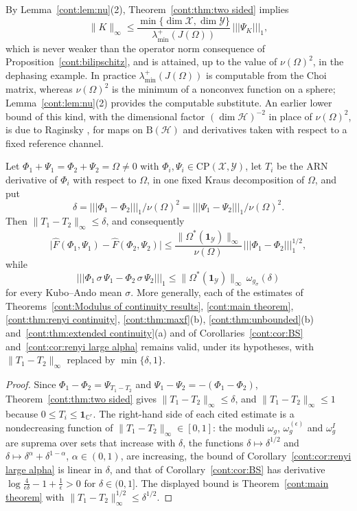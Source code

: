 \begin{remark}
By Lemma~\ref{cont:lem:nu}(2), Theorem~\ref{cont:thm:two sided} implies
\[
\|K\|_\infty\leq\frac{\min\{\dim\mathcal{X},\dim\mathcal{Y}\}}{\lambda^+_{\min}(J(\Omega))}\,|||\Psi_K|||_1 ,
\]
which is never weaker than the operator norm consequence of Proposition~\ref{cont:bilipschitz}, and is attained, up to the value of $\nu(\Omega)^2$, in the dephasing example. In practice $\lambda^+_{\min}(J(\Omega))$ is computable from the Choi matrix, whereas $\nu(\Omega)^2$ is the minimum of a nonconvex function on a sphere; Lemma~\ref{cont:lem:nu}(2) provides the computable substitute. An earlier lower bound of this kind, with the dimensional factor $(\dim\mathcal{H})^{-2}$ in place of $\nu(\Omega)^2$, is due to Raginsky \cite[eq.~(17)]{Raginsky2003}, for maps on $\mathrm{B}(\mathcal{H})$ and derivatives taken with respect to a fixed reference channel.
\end{remark}

\begin{corollary}\label{cont:cor:cb continuity}
Let $\Phi_1+\Psi_1=\Phi_2+\Psi_2=\Omega\neq0$ with $\Phi_i,\Psi_i\in\mathrm{CP}(\mathcal{X},\mathcal{Y})$, let $T_i$ be the ARN derivative of $\Phi_i$ with respect to $\Omega$, in one fixed Kraus decomposition of $\Omega$, and put
\[
\delta=|||\Phi_1-\Phi_2|||_1/\nu(\Omega)^2=|||\Psi_1-\Psi_2|||_1/\nu(\Omega)^2.
\]
Then $\|T_1-T_2\|_\infty\leq\delta$, and consequently
\[
\big|\widehat{F}(\Phi_1,\Psi_1)-\widehat{F}(\Phi_2,\Psi_2)\big|\leq\frac{\|\Omega^*(\mathbf{1}_{\mathcal{Y}})\|_\infty}{\nu(\Omega)}\,|||\Phi_1-\Phi_2|||_1^{1/2},
\]
while
\[
|||\Phi_1\,\sigma\,\Psi_1-\Phi_2\,\sigma\,\Psi_2|||_1\leq\|\Omega^*(\mathbf{1}_{\mathcal{Y}})\|_\infty\,\omega_{g_\sigma}(\delta)
\]
for every Kubo--Ando mean $\sigma$. More generally, each of the estimates of Theorems~\ref{cont:Modulus of continuity results}, \ref{cont:main theorem}, \ref{cont:thm:renyi continuity}, \ref{cont:thm:maxf}(b), \ref{cont:thm:unbounded}(b) and~\ref{cont:thm:extended continuity}(a) and of Corollaries~\ref{cont:cor:BS} and~\ref{cont:cor:renyi large alpha} remains valid, under its hypotheses, with $\|T_1-T_2\|_\infty$ replaced by $\min\{\delta,1\}$.
\end{corollary}

\begin{proof}
Since $\Phi_1-\Phi_2=\Psi_{T_1-T_2}$ and $\Psi_1-\Psi_2=-(\Phi_1-\Phi_2)$, Theorem~\ref{cont:thm:two sided} gives $\|T_1-T_2\|_\infty\leq\delta$, and $\|T_1-T_2\|_\infty\leq1$ because $0\leq T_i\leq\mathbf{1}_{\mathbb{C}^r}$. The right-hand side of each cited estimate is a nondecreasing function of $\|T_1-T_2\|_\infty\in[0,1]$: the moduli $\omega_g$, $\omega^{(\epsilon)}_g$ and $\omega^I_g$ are suprema over sets that increase with $\delta$, the functions $\delta\mapsto\delta^{1/2}$ and $\delta\mapsto\delta^\alpha+\delta^{1-\alpha}$, $\alpha\in(0,1)$, are increasing, the bound of Corollary~\ref{cont:cor:renyi large alpha} is linear in $\delta$, and that of Corollary~\ref{cont:cor:BS} has derivative $\log\frac{4}{\epsilon\delta}-1+\frac1\epsilon>0$ for $\delta\in(0,1]$. The displayed bound is Theorem~\ref{cont:main theorem} with $\|T_1-T_2\|_\infty^{1/2}\leq\delta^{1/2}$.
\end{proof}

